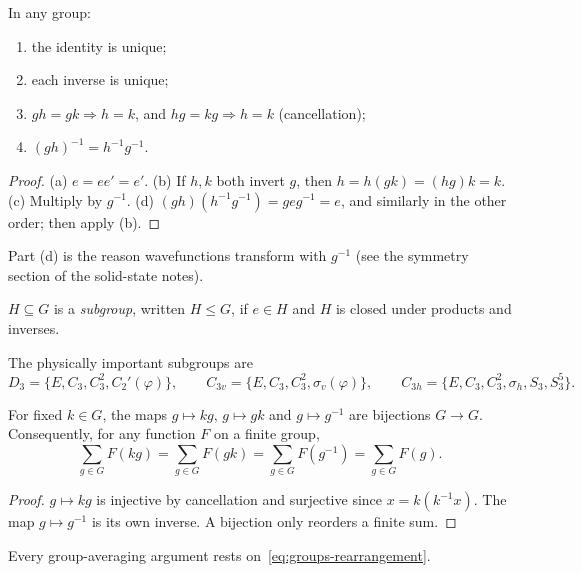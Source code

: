\begin{theorem}
In any group:
\begin{enumerate}
    \item the identity is unique;
    \item each inverse is unique;
    \item $gh = gk\Rightarrow h = k$, and $hg = kg \Rightarrow h = k$ (cancellation);
    \item $(gh)^{-1} = h^{-1}g^{-1}$.
\end{enumerate}
\end{theorem}
\begin{proof}
(a) $e = ee' = e'$. (b) If $h,k$ both invert $g$, then $h = h(gk) = (hg)k = k$. (c) Multiply by $g^{-1}$. (d) $(gh)(h^{-1}g^{-1}) = geg^{-1} = e$, and similarly in the other order; then apply (b).
\end{proof}
Part (d) is the reason wavefunctions transform with $g^{-1}$ (see the symmetry section of the solid-state notes).

\begin{definition}[Subgroup]
$H\subseteq G$ is a \emph{subgroup}, written $H\le G$, if $e\in H$ and $H$ is closed under products and inverses.
\end{definition}

\begin{example}[Subgroups of $D_{3h}$]
The physically important subgroups are
\[
    D_3 = \{E, C_3, C_3^2, C_2'(\varphi)\},\qquad
    C_{3v} = \{E, C_3, C_3^2, \sigma_v(\varphi)\},\qquad
    C_{3h} = \{E, C_3, C_3^2, \sigma_h, S_3, S_3^5\}.
\]
\end{example}

\begin{theorem}
For fixed $k\in G$, the maps $g\mapsto kg$, $g\mapsto gk$ and $g\mapsto g^{-1}$ are bijections $G\to G$. Consequently, for any function $F$ on a finite group,
\begin{equation}
    \sum_{g\in G}F(kg) = \sum_{g\in G}F(gk) = \sum_{g\in G}F(g^{-1}) = \sum_{g\in G}F(g).
    \label{eq:groups-rearrangement}
\end{equation}
\end{theorem}
\begin{proof}
$g\mapsto kg$ is injective by cancellation and surjective since $x = k(k^{-1}x)$. The map $g\mapsto g^{-1}$ is its own inverse. A bijection only reorders a finite sum.
\end{proof}
Every group-averaging argument rests on~\eqref{eq:groups-rearrangement}.

